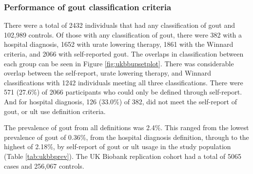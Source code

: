 \documentclass[twoside,openright]{report}
\begin{document}
\subsubsection{Performance of gout classification
criteria}\label{performance-of-gout-classification-criteria}

There were a total of 2432 individuals that had any classification of
gout and 102,989 controls. Of those with any classification of gout,
there were 382 with a hospital diagnosis, 1652 with urate lowering
therapy, 1861 with the Winnard criteria, and 2066 with self-reported
gout. The overlaps in classification between each group can be seen in
Figure \ref{fig:ukbbupsetplot}. There was considerable overlap between
the self-report, urate lowering therapy, and Winnard classifications
with 1242 individuals meeting all three classifications. There were 571
(27.6\%) of 2066 participants who could only be defined through
self-report. And for hospital diagnosis, 126 (33.0\%) of 382, did not
meet the self-report of gout, or \gls{ult} use definition criteria.

The prevalence of gout from all definitions was 2.4\%. This ranged from
the lowest prevalence of gout of 0.36\%, from the hospital diagnosis
definition, through to the highest of 2.18\%, by self-report of gout or
\gls{ult} usage in the study population (Table \ref{tab:ukbbprev}). The
UK Biobank replication cohort had a total of 5065 cases and 256,067
controls.
\end{document}
